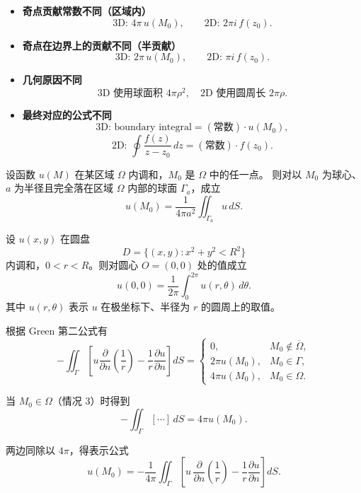 \begin{note}[式 (2.7) 的来源与意义]
\begin{itemize}
  \item \textbf{奇点贡献常数不同（区域内）}  
  \[
  \text{3D: } 4\pi\,u(M_0),
  \qquad
  \text{2D: } 2\pi i\, f(z_0).
  \]

  \item \textbf{奇点在边界上的贡献不同（半贡献）}  
  \[
  \text{3D: } 2\pi\,u(M_0),
  \qquad
  \text{2D: } \pi i\,f(z_0).
  \]

  \item \textbf{几何原因不同}  
  \[
  \text{3D 使用球面积 } 4\pi\rho^2,\quad
  \text{2D 使用圆周长 } 2\pi\rho.
  \]

  \item \textbf{最终对应的公式不同}  
  \[
  \text{3D: boundary integral} = (\text{常数})\cdot u(M_0),
  \]
  \[
  \text{2D: } 
  \oint \frac{f(z)}{z-z_0}\,dz 
  = (\text{常数})\cdot f(z_0).
  \]

\end{itemize}
\begin{theorem}[平均值公式]
设函数 $u(M)$ 在某区域 $\Omega$ 内调和，$M_0$ 是 $\Omega$ 中的任一点。
则对以 $M_0$ 为球心、$a$ 为半径且完全落在区域 $\Omega$ 内部的球面 $\Gamma_a$，成立
\begin{equation}\label{eq:mean-value}
u(M_0)
=
\frac{1}{4\pi a^{2}}
\iint_{\Gamma_a} u\,dS.
\tag{2.13}
\end{equation}
\end{theorem}
\begin{theorem}[调和函数的平均值定理]
设 $u(x,y)$ 在圆盘 
\[
D=\{(x,y): x^2+y^2< R^2\}
\]
内调和，$0<r<R$。则对圆心 $O=(0,0)$ 处的值成立
\begin{equation}\label{eq:mean2D}
u(0,0)
=
\frac{1}{2\pi}
\int_{0}^{2\pi} u(r,\theta)\,d\theta .
\end{equation}
其中 $u(r,\theta)$ 表示 $u$ 在极坐标下、半径为 $r$ 的圆周上的取值。
\end{theorem}

根据 Green 第二公式有
\[
-\iint_{\Gamma}
\left[
u\frac{\partial}{\partial n}\left(\frac{1}{r}\right)
-\frac{1}{r}\frac{\partial u}{\partial n}
\right]dS
=
\begin{cases}
0, & M_0\notin \overline{\Omega},\\[4pt]
2\pi u(M_0), & M_0\in \Gamma,\\[4pt]
4\pi u(M_0), & M_0\in\Omega.
\end{cases}
\]

当 $M_0\in\Omega$（情况 3）时得到
\[
- \iint_{\Gamma} [\cdots]\, dS = 4\pi u(M_0).
\]

两边同除以 \(4\pi\)，得表示公式
\[
u(M_0)
= -\frac{1}{4\pi}
\iint_{\Gamma}
\left[
u\,\frac{\partial}{\partial n}\left(\frac{1}{r}\right)
-
\frac{1}{r}\frac{\partial u}{\partial n}
\right]dS.
\]

\end{note}
